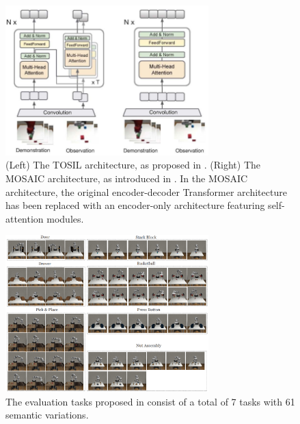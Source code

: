 \begin{figure}[t]
    \centering
    \includegraphics[width=0.7\textwidth]{figures/images/mosaic/architecture_comparison.png}
    \caption{(Left) The TOSIL architecture, as proposed in \cite{dasari2021transformers_one_shot}. (Right) The MOSAIC architecture, as introduced in \cite{mandi2022towards_more_generalizable_one_shot}. In the MOSAIC architecture, the original encoder-decoder Transformer architecture has been replaced with an encoder-only architecture featuring self-attention modules.}
    \label{fig:mosaic_architecture}
\end{figure}

\begin{figure}[t]
    \centering
    \includegraphics[width=0.7\textwidth]{figures/images/mosaic/mosaic_tasks.png}
    \caption{The evaluation tasks proposed in \cite{mandi2022towards_more_generalizable_one_shot} consist of a total of 7 tasks with 61 semantic variations.}
    \label{fig:mosaic_task}
\end{figure}